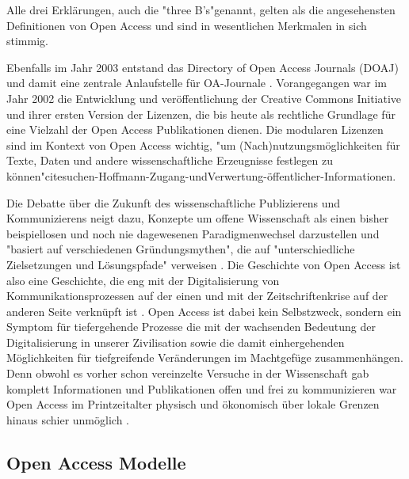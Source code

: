 Alle drei Erklärungen, auch die "three B's"\cite{suber_2004_praising_oa}genannt, gelten als die angesehensten Definitionen von Open Access und sind in wesentlichen Merkmalen in sich stimmig\cite{albert_2006_open_implications}.

Ebenfalls im Jahr 2003 entstand das Directory of Open Access Journals (DOAJ) und damit eine zentrale Anlaufstelle für OA-Journale \cite{suchen-Hoffmann-Zugang-undVerwertung-öffentlicher-Informationen}. Vorangegangen war im Jahr 2002 die Entwicklung und veröffentlichung der Creative Commons Initiative \cite{suchen-Hoffmann-Zugang-undVerwertung-öffentlicher-Informationen} und ihrer ersten Version der Lizenzen, die bis heute als rechtliche Grundlage für eine Vielzahl der Open Access Publikationen dienen\cite{suchen}. Die modularen Lizenzen sind im Kontext von Open Access wichtig, "um (Nach)nutzungsmöglichkeiten für Texte, Daten und andere wissenschaftliche Erzeugnisse festlegen zu können"cite{suchen-Hoffmann-Zugang-undVerwertung-öffentlicher-Informationen}.

Die Debatte über die Zukunft des wissenschaftliche Publizierens und Kommunizierens neigt dazu, Konzepte um offene Wissenschaft als einen bisher beispiellosen und noch nie dagewesenen Paradigmenwechsel darzustellen \cite{cite:17a} \cite{cite:17b} und "basiert auf verschiedenen Gründungsmythen", die auf "unterschiedliche Zielsetzungen und Lösungspfade" verweisen \cite{suchen-Hoffmann-Zugang-undVerwertung-öffentlicher-Informationen}. Die Geschichte von Open Access ist also eine Geschichte, die eng mit der Digitalisierung von Kommunikationsprozessen \cite{albert_2006_open_implications} auf der einen und mit der Zeitschriftenkrise auf der anderen Seite verknüpft ist \cite{suchen-Hoffmann-Zugang-undVerwertung-öffentlicher-Informationen}. Open Access ist dabei kein Selbstzweck\cite{cite:17d}, sondern ein Symptom für tiefergehende Prozesse die mit der wachsenden Bedeutung der Digitalisierung in unserer Zivilisation sowie die damit einhergehenden Möglichkeiten für tiefgreifende Veränderungen im Machtgefüge zusammenhängen\cite{cite:17e}. Denn obwohl es vorher schon vereinzelte Versuche in der Wissenschaft gab komplett Informationen und Publikationen offen und frei zu kommunizieren war Open Access im Printzeitalter physisch und ökonomisch über lokale Grenzen hinaus schier unmöglich \cite{cite:18a}. 

\subsection{Open Access Modelle}

